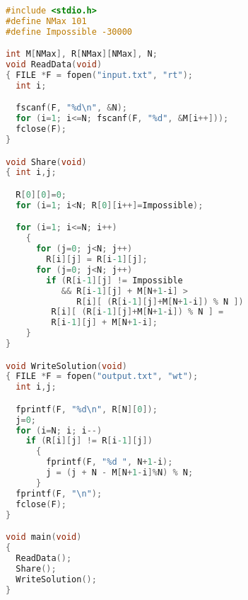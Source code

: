 \begin{lstlisting}[language=C]
#include <stdio.h>
#define NMax 101
#define Impossible -30000

int M[NMax], R[NMax][NMax], N;
void ReadData(void)
{ FILE *F = fopen("input.txt", "rt");
  int i;

  fscanf(F, "%d\n", &N);
  for (i=1; i<=N; fscanf(F, "%d", &M[i++]));
  fclose(F);
}

void Share(void)
{ int i,j;

  R[0][0]=0;
  for (i=1; i<N; R[0][i++]=Impossible);

  for (i=1; i<=N; i++)
    {
      for (j=0; j<N; j++)
        R[i][j] = R[i-1][j];
      for (j=0; j<N; j++)
        if (R[i-1][j] != Impossible
           && R[i-1][j] + M[N+1-i] > 
              R[i][ (R[i-1][j]+M[N+1-i]) % N ])
         R[i][ (R[i-1][j]+M[N+1-i]) % N ] =
         R[i-1][j] + M[N+1-i];
    }
}

void WriteSolution(void)
{ FILE *F = fopen("output.txt", "wt");
  int i,j;

  fprintf(F, "%d\n", R[N][0]);
  j=0;
  for (i=N; i; i--)
    if (R[i][j] != R[i-1][j])
      {
        fprintf(F, "%d ", N+1-i);
        j = (j + N - M[N+1-i]%N) % N;
      }
  fprintf(F, "\n");
  fclose(F);
}

void main(void)
{
  ReadData();
  Share();
  WriteSolution();
}
\end{lstlisting}
